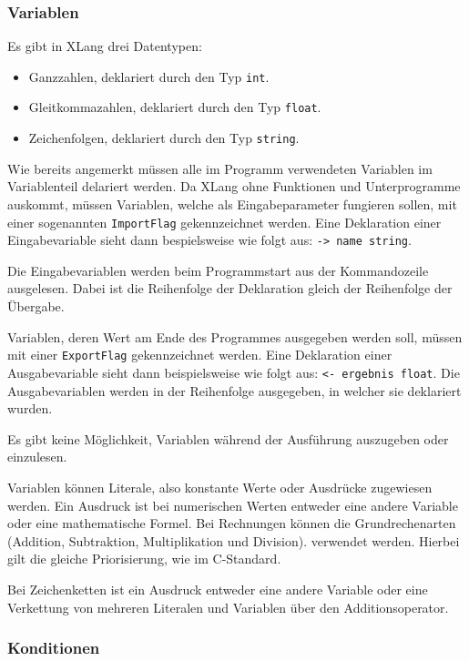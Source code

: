 \documentclass[a4paper]{article}
\begin{document}
\subsubsection{Variablen}

Es gibt in XLang drei Datentypen:

\begin{itemize}
	\item Ganzzahlen, deklariert durch den Typ \texttt{int}.
	\item Gleitkommazahlen, deklariert durch den Typ \texttt{float}.
	\item Zeichenfolgen, deklariert durch den Typ \texttt{string}.
\end{itemize}

Wie bereits angemerkt müssen alle im Programm verwendeten Variablen im Variablenteil delariert
werden.
Da XLang ohne Funktionen und Unterprogramme auskommt, müssen Variablen, welche als Eingabeparameter
fungieren sollen, mit einer sogenannten \texttt{ImportFlag} gekennzeichnet werden. Eine Deklaration
einer Eingabevariable sieht dann bespielsweise wie folgt aus: \texttt{-> name string}.

Die Eingabevariablen werden beim Programmstart aus der Kommandozeile ausgelesen.
Dabei ist die Reihenfolge der Deklaration gleich der Reihenfolge der Übergabe.

Variablen, deren Wert am Ende des Programmes ausgegeben werden soll, müssen mit einer
\texttt{ExportFlag} gekennzeichnet werden. Eine Deklaration einer Ausgabevariable sieht dann
beispielsweise wie folgt aus: \texttt{<- ergebnis float}.
Die Ausgabevariablen werden in der Reihenfolge ausgegeben, in welcher sie deklariert wurden.

Es gibt keine Möglichkeit, Variablen während der Ausführung auszugeben oder einzulesen.

Variablen können Literale, also konstante Werte oder Ausdrücke zugewiesen werden.
Ein Ausdruck ist bei numerischen Werten entweder eine andere Variable oder eine mathematische
Formel. Bei Rechnungen können die Grundrechenarten (Addition, Subtraktion, Multiplikation und
Division). verwendet werden. Hierbei gilt die gleiche Priorisierung, wie im C-Standard.

Bei Zeichenketten ist ein Ausdruck entweder eine andere Variable oder eine Verkettung von mehreren
Literalen und Variablen über den Additionsoperator.

\subsubsection{Konditionen}
\end{document}
